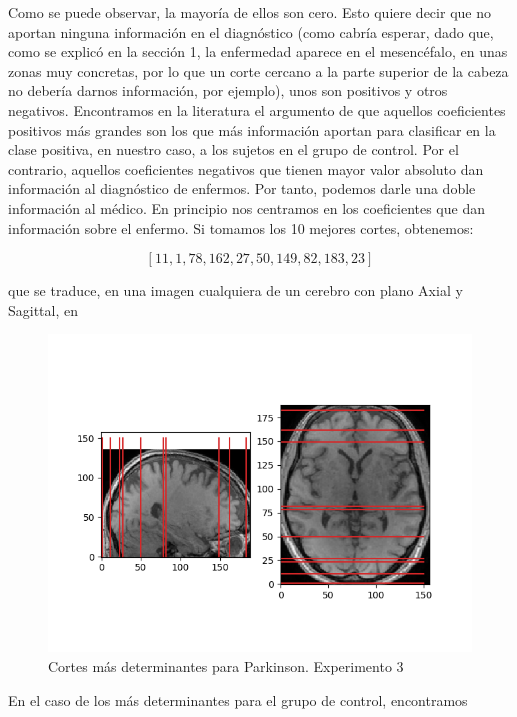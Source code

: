 Como se puede observar, la mayoría de ellos son cero. Esto quiere decir que no aportan ninguna información en el diagnóstico (como cabría esperar, dado que, como se explicó en la sección 1, la enfermedad aparece en el mesencéfalo, en unas zonas muy concretas, por lo que un corte cercano a la parte superior de la cabeza no debería darnos información, por ejemplo), unos son positivos y otros negativos. Encontramos en la literatura el argumento de que aquellos coeficientes positivos más grandes son los que más información aportan para clasificar en la clase positiva, en nuestro caso, a los sujetos en el grupo de control. Por el contrario, aquellos coeficientes negativos que tienen mayor valor absoluto dan información al diagnóstico de enfermos. Por tanto, podemos darle una doble información al médico. En principio nos centramos en los coeficientes que dan información sobre el enfermo. Si tomamos los 10 mejores cortes, obtenemos:

$$[11, 1, 78, 162, 27, 50, 149, 82, 183, 23]$$

que se traduce, en una imagen cualquiera de un cerebro con plano Axial y Sagittal, en

\begin{figure}[H] %
	\centering
	\includegraphics[scale=0.8]{cortes-PD-exp3.png}  %
	\caption{Cortes más determinantes para Parkinson. Experimento 3} 
	\label{fig:cortes-PD-exp3}
\end{figure}

En el caso de los más determinantes para el grupo de control, encontramos 

